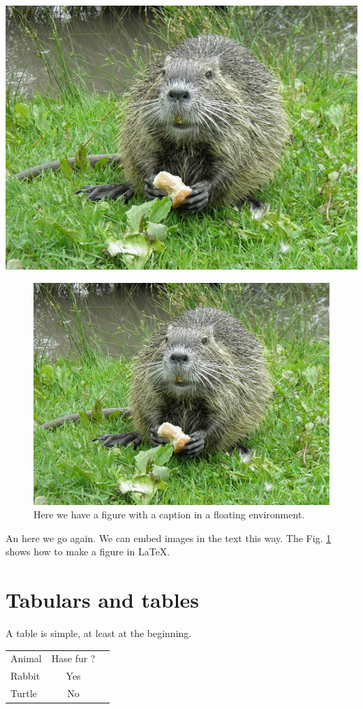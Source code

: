 \documentclass[10pt,a4paper,twoside]{article}
\begin{document}
\begin{center}
  \includegraphics[width = .8\textwidth]{figures/ragondin_small.jpg}
\end{center}

\begin{figure}[hb]
  \begin{center}
    \includegraphics[width = .5\textwidth]{figures/ragondin_small.jpg}
  \end{center}
  \caption{
    Here we have a figure with a caption in a floating environment.
  }
  \label{fig:ragondin_explained}
\end{figure}

\noindent An here we go again.
We can embed images in the text this way.
The Fig. \ref{fig:ragondin_explained} shows how to make a figure in \LaTeX .




\blindtext[4]

\section{Tabulars and tables}

A table is simple, at least at the beginning.

\begin{center}
  \begin{tabular}{l|cr} %
    \hline %
    Animal & Hase fur ? \\
    Rabbit & Yes        \\
    Turtle & No         \\
    \hline
  \end{tabular}
\end{center}
\end{document}
